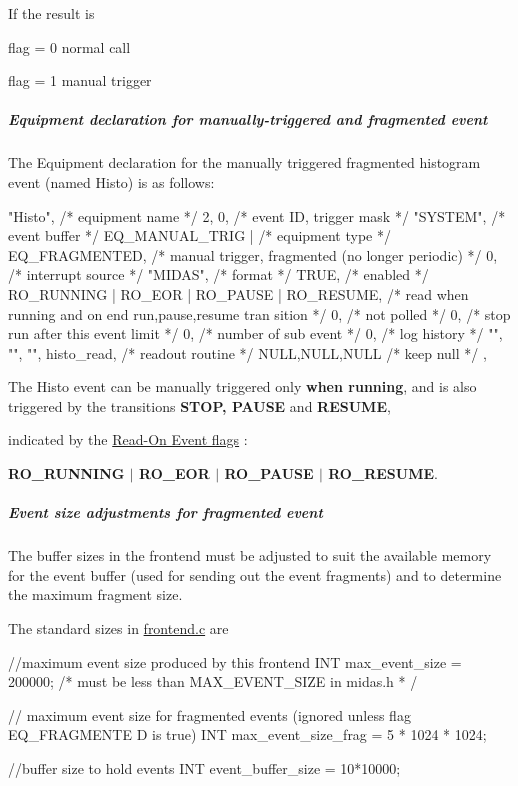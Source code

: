 \par
 If the result is
\begin{DoxyItemize}
\item flag = 0 normal call
\item flag = 1 manual trigger
\end{DoxyItemize}\hypertarget{FE_eq_event_routines_FE_tdmusr_equipment}{}\subparagraph{Equipment declaration for manually-\/triggered and fragmented event}\label{FE_eq_event_routines_FE_tdmusr_equipment}
The Equipment declaration for the manually triggered fragmented histogram event (named Histo) is as follows:


\begin{DoxyCode}
 { "Histo",             /* equipment name */
    2, 0,                 /* event ID, trigger mask */
    "SYSTEM",             /* event buffer */
    EQ_MANUAL_TRIG |     /* equipment type */
    EQ_FRAGMENTED,        /*    manual trigger, fragmented (no longer periodic)
 */
    0,                    /* interrupt source */
    "MIDAS",               /* format */
    TRUE,                 /* enabled */
    RO_RUNNING | RO_EOR |
    RO_PAUSE | RO_RESUME, /* read when running and on end run,pause,resume tran
sition */
    0,                    /* not polled */
    0,                    /* stop run after this event limit */
    0,                    /* number of sub event */
    0,                    /* log history */
   "", "", "",
    histo_read,     /* readout routine */
    NULL,NULL,NULL       /* keep null */
  },
\end{DoxyCode}


The Histo event can be manually triggered only {\bfseries when running}, and is also triggered by the transitions {\bfseries STOP, PAUSE} and {\bfseries RESUME}, \par
indicated by the \hyperlink{FE_table_FE_tbl_ReadOn}{Read-\/On Event flags} : \par
 {\bfseries RO\_\-RUNNING $|$ RO\_\-EOR $|$ RO\_\-PAUSE $|$ RO\_\-RESUME}.

\label{FE_eq_event_routines_idx_event_fragmented_size}
\hypertarget{FE_eq_event_routines_idx_event_fragmented_size}{}
 \hypertarget{FE_eq_event_routines_FE_frag_max_event_size}{}\subparagraph{Event size adjustments for fragmented event}\label{FE_eq_event_routines_FE_frag_max_event_size}
The buffer sizes in the frontend must be adjusted to suit the available memory for the event buffer (used for sending out the event fragments) and to determine the maximum fragment size.

The standard sizes in \hyperlink{frontend_8c}{frontend.c} are 
\begin{DoxyCode}
    //maximum event size produced by this frontend
    INT max_event_size = 200000; /* must be less than MAX_EVENT_SIZE in midas.h *
      / 

    // maximum event size for fragmented events (ignored unless flag EQ_FRAGMENTE
      D is true) 
    INT max_event_size_frag = 5 * 1024 * 1024;

    //buffer size to hold events
    INT event_buffer_size = 10*10000;
\end{DoxyCode}


